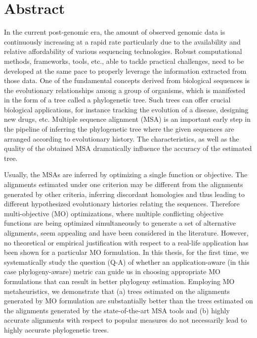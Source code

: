 \chapter*{Abstract}
\begin{spacing}{1.28}
In the current post-genomic era, the amount of observed genomic data is continuously increasing at a rapid rate particularly due to the availability and relative affordability of various sequencing technologies. Robust computational methods, frameworks, tools, etc., able to tackle practical challenges, need to be developed at the same pace to properly leverage the information extracted from those data. One of the fundamental concepts derived from biological sequences is the evolutionary relationships among a group of organisms, which is manifested in the form of a tree called a phylogenetic tree. Such trees can offer crucial biological applications, for instance tracking the evolution of a disease, designing new drugs, etc. Multiple sequence alignment (MSA) is an important early step in the pipeline of inferring the phylogenetic tree where the given sequences are arranged according to evolutionary history. The characteristics, as well as the quality of the obtained MSA dramatically influence the accuracy of the estimated tree. 

Usually, the MSAs are inferred by optimizing a single function or objective. The alignments estimated under one criterion may be different from the alignments generated by other criteria, inferring discordant homologies and thus leading to different hypothesized evolutionary histories relating the sequences. Therefore multi-objective (MO) optimizations, where multiple conflicting objective functions are being optimized simultaneously to generate a set of alternative alignments, seem appealing and have been considered in the literature. However, no theoretical or empirical justification with respect to a real-life application has been shown for a particular MO formulation. In this thesis, for the first time, we systematically study the question (Q-A) of whether an application-aware (in this case phylogeny-aware) metric can guide us in choosing appropriate MO formulations that can result in better phylogeny estimation. Employing MO metaheuristics, we demonstrate that (a) trees estimated on the alignments generated by MO formulation are substantially better than the trees estimated on the alignments generated by the state-of-the-art MSA tools and (b) highly accurate alignments with respect to popular measures do not necessarily lead to highly accurate phylogenetic trees. 


\end{spacing}
